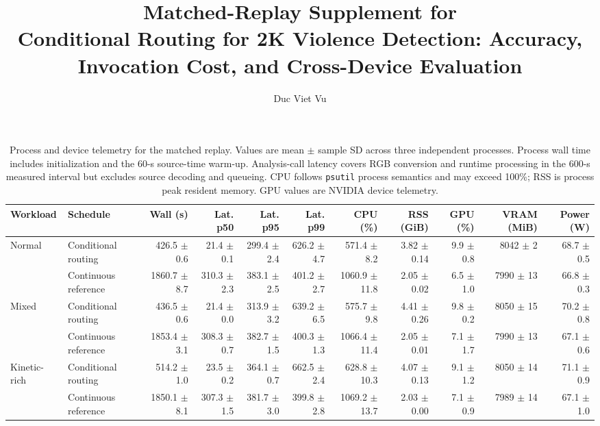 \documentclass[9pt]{article}
\title{Matched-Replay Supplement for\\\large Conditional Routing for 2K Violence Detection: Accuracy, Invocation Cost, and Cross-Device Evaluation}
\author{Duc Viet Vu}
\date{}
\begin{document}
\maketitle
\vspace{-8mm}
\begin{table}[ht]
\caption{Process and device telemetry for the matched replay. Values are mean $\pm$ sample SD across three independent processes. Process wall time includes initialization and the 60-s source-time warm-up. Analysis-call latency covers RGB conversion and runtime processing in the 600-s measured interval but excludes source decoding and queueing. CPU follows \texttt{psutil} process semantics and may exceed 100\%; RSS is process peak resident memory. GPU values are NVIDIA device telemetry.}
\centering\scriptsize
\begin{tabular}{@{}llrrrrrrrrr@{}}
\toprule
Workload & Schedule & Wall (s) & Lat. p50 & Lat. p95 & Lat. p99 & CPU (\%) & RSS (GiB) & GPU (\%) & VRAM (MiB) & Power (W)\\
\midrule
Normal & Conditional routing & 426.5 $\pm$ 0.6 & 21.4 $\pm$ 0.1 & 299.4 $\pm$ 2.4 & 626.2 $\pm$ 4.7 & 571.4 $\pm$ 8.2 & 3.82 $\pm$ 0.14 & 9.9 $\pm$ 0.8 & 8042 $\pm$ 2 & 68.7 $\pm$ 0.5\\
 & Continuous reference & 1860.7 $\pm$ 8.7 & 310.3 $\pm$ 2.3 & 383.1 $\pm$ 2.5 & 401.2 $\pm$ 2.7 & 1060.9 $\pm$ 11.8 & 2.05 $\pm$ 0.02 & 6.5 $\pm$ 1.0 & 7990 $\pm$ 13 & 66.8 $\pm$ 0.3\\
\addlinespace
Mixed & Conditional routing & 436.5 $\pm$ 0.6 & 21.4 $\pm$ 0.0 & 313.9 $\pm$ 3.2 & 639.2 $\pm$ 6.5 & 575.7 $\pm$ 9.8 & 4.41 $\pm$ 0.26 & 9.8 $\pm$ 0.2 & 8050 $\pm$ 15 & 70.2 $\pm$ 0.8\\
 & Continuous reference & 1853.4 $\pm$ 3.1 & 308.3 $\pm$ 0.7 & 382.7 $\pm$ 1.5 & 400.3 $\pm$ 1.3 & 1066.4 $\pm$ 11.4 & 2.05 $\pm$ 0.01 & 7.1 $\pm$ 1.7 & 7990 $\pm$ 13 & 67.1 $\pm$ 0.6\\
\addlinespace
Kinetic-rich & Conditional routing & 514.2 $\pm$ 1.0 & 23.5 $\pm$ 0.2 & 364.1 $\pm$ 0.7 & 662.5 $\pm$ 2.4 & 628.8 $\pm$ 10.3 & 4.07 $\pm$ 0.13 & 9.1 $\pm$ 1.2 & 8050 $\pm$ 14 & 71.1 $\pm$ 0.9\\
 & Continuous reference & 1850.1 $\pm$ 8.1 & 307.3 $\pm$ 1.5 & 381.7 $\pm$ 3.0 & 399.8 $\pm$ 2.8 & 1069.2 $\pm$ 13.7 & 2.03 $\pm$ 0.00 & 7.1 $\pm$ 0.9 & 7989 $\pm$ 14 & 67.1 $\pm$ 1.0\\
\bottomrule
\end{tabular}
\end{table}
\end{document}
